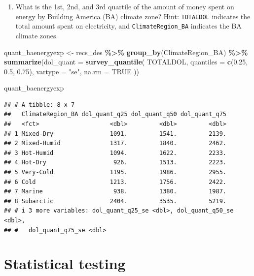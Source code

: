 \documentclass[
]{krantz}
\makeatletter
\newenvironment{Shaded}{\begin{snugshade}}{\end{snugshade}}
\newcommand{\AttributeTok}[1]{\textcolor[rgb]{0.27,0.27,0.27}{#1}}
\newcommand{\ConstantTok}[1]{\textcolor[rgb]{0.37,0.37,0.37}{#1}}
\newcommand{\FloatTok}[1]{\textcolor[rgb]{0.06,0.06,0.06}{#1}}
\newcommand{\FunctionTok}[1]{\textcolor[rgb]{0.27,0.27,0.27}{\textbf{#1}}}
\newcommand{\NormalTok}[1]{#1}
\newcommand{\OtherTok}[1]{\textcolor[rgb]{0.37,0.37,0.37}{#1}}
\newcommand{\SpecialCharTok}[1]{\textcolor[rgb]{0.43,0.43,0.43}{\textbf{#1}}}
\newcommand{\StringTok}[1]{\textcolor[rgb]{0.5,0.5,0.5}{#1}}
\providecommand{\tightlist}{%
  \setlength{\itemsep}{0pt}\setlength{\parskip}{0pt}}
\newenvironment{kframe}{%
\medskip{}
\setlength{\fboxsep}{.8em}
 \def\at@end@of@kframe{}%
 \ifinner\ifhmode%
  \def\at@end@of@kframe{\end{minipage}}%
  \begin{minipage}{\columnwidth}%
 \fi\fi%
 \def\FrameCommand##1{\hskip\@totalleftmargin \hskip-\fboxsep
 \colorbox{shadecolor}{##1}\hskip-\fboxsep
     \hskip-\linewidth \hskip-\@totalleftmargin \hskip\columnwidth}%
 \MakeFramed {\advance\hsize-\width
   \@totalleftmargin\z@ \linewidth\hsize
   \@setminipage}}%
 {\par\unskip\endMakeFramed%
 \at@end@of@kframe}
\renewenvironment{Shaded}{\begin{kframe}}{\end{kframe}}
\makeatother
\begin{document}
\begin{enumerate}
\def\labelenumi{\arabic{enumi}.}
\setcounter{enumi}{8}
\tightlist
\item
  What is the 1st, 2nd, and 3rd quartile of the amount of money spent on energy by Building America (BA) climate zone? Hint: \texttt{TOTALDOL} indicates the total amount spent on electricity, and \texttt{ClimateRegion\_BA} indicates the BA climate zones.
\end{enumerate}

\begin{Shaded}
\begin{Highlighting}[]
\NormalTok{quant\_baenergyexp }\OtherTok{\textless{}{-}}\NormalTok{ recs\_des }\SpecialCharTok{\%\textgreater{}\%}
  \FunctionTok{group\_by}\NormalTok{(ClimateRegion\_BA) }\SpecialCharTok{\%\textgreater{}\%}
  \FunctionTok{summarize}\NormalTok{(}\AttributeTok{dol\_quant =} \FunctionTok{survey\_quantile}\NormalTok{(}
\NormalTok{    TOTALDOL,}
    \AttributeTok{quantiles =} \FunctionTok{c}\NormalTok{(}\FloatTok{0.25}\NormalTok{, }\FloatTok{0.5}\NormalTok{, }\FloatTok{0.75}\NormalTok{),}
    \AttributeTok{vartype =} \StringTok{"se"}\NormalTok{,}
    \AttributeTok{na.rm =} \ConstantTok{TRUE}
\NormalTok{  ))}

\NormalTok{quant\_baenergyexp}
\end{Highlighting}
\end{Shaded}

\begin{verbatim}
## # A tibble: 8 x 7
##   ClimateRegion_BA dol_quant_q25 dol_quant_q50 dol_quant_q75
##   <fct>                    <dbl>         <dbl>         <dbl>
## 1 Mixed-Dry                1091.         1541.         2139.
## 2 Mixed-Humid              1317.         1840.         2462.
## 3 Hot-Humid                1094.         1622.         2233.
## 4 Hot-Dry                   926.         1513.         2223.
## 5 Very-Cold                1195.         1986.         2955.
## 6 Cold                     1213.         1756.         2422.
## 7 Marine                    938.         1380.         1987.
## 8 Subarctic                2404.         3535.         5219.
## # i 3 more variables: dol_quant_q25_se <dbl>, dol_quant_q50_se <dbl>,
## #   dol_quant_q75_se <dbl>
\end{verbatim}

\hypertarget{c06-statistical-testing}{%
\chapter{Statistical testing}\label{c06-statistical-testing}}
\end{document}
